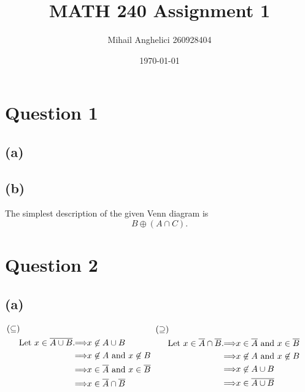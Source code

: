 \documentclass[12pt]{article}
\title{MATH 240 Assignment 1}
\author{Mihail Anghelici 260928404 }
\date{\today}
\theoremstyle{definition}
\theoremstyle{definition}
\theoremstyle{definition}
\theoremstyle{definition}
\theoremstyle{definition}
\theoremstyle{example}
\theoremstyle{note}
\theoremstyle{remark}
\let\oldimplies\implies
\renewcommand*{\implies}{
	\hspace{-0.05cm}\resizebox{.95\width}{\height}{$\oldimplies$}\hspace{-0.05cm}
}
\begin{document}
	\maketitle
	\section*{Question 1}
	\subsection*{(a) }
		\begin{center}
			\begin{venndiagram3sets}[tikzoptions={scale=1.5, thick}, showframe={false}]
				\fillACapBCapC
				\fillOnlyC
			\end{venndiagram3sets}
		\end{center}
	\subsection*{(b) }
		The simplest description of the given Venn diagram is $$ B \oplus (A \cap C).$$
	\section*{Question 2}
		\subsection*{(a) }
		\[ 
			\begin{aligned}
				&\hspace{-2.8cm}(\subseteq) \\
				\text{Let } x \in \overline{A \cup B}. &\implies x \not\in A \cup B \\
				&\implies x \not\in A \text{ and } x \not\in B \\
				&\implies x \in \overline{A} \text{ and } x \in \overline{B} \\
				&\implies x \in \overline{A} \cap \overline{B} 
			\end{aligned}
			\qquad 
			\begin{aligned}
				&\hspace{-2.8cm}(\supseteq) \\
				\text{Let } x \in \overline{A} \cap \overline{B}. &\implies x \in \overline{A} \text{ and } x \in \overline{B} \\
				&\implies x \not\in A \text{ and } x \not\in B\\
				&\implies x \not\in A \cup B \\
				&\implies x \in \overline{A \cup B}
			\end{aligned}
		\]
\end{document}
